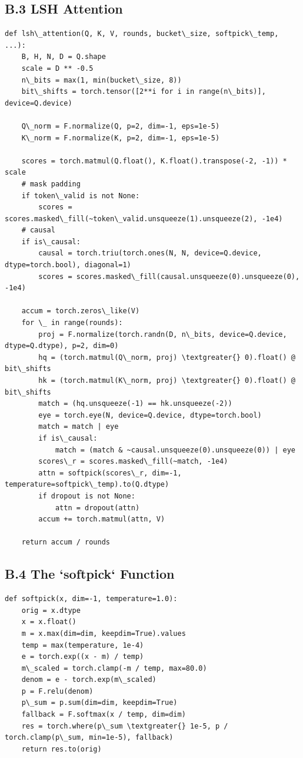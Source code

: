 \subsection{B.3 LSH Attention}

\begin{lstlisting}
def lsh\_attention(Q, K, V, rounds, bucket\_size, softpick\_temp, ...):
    B, H, N, D = Q.shape
    scale = D ** -0.5
    n\_bits = max(1, min(bucket\_size, 8))
    bit\_shifts = torch.tensor([2**i for i in range(n\_bits)], device=Q.device)
    
    Q\_norm = F.normalize(Q, p=2, dim=-1, eps=1e-5)
    K\_norm = F.normalize(K, p=2, dim=-1, eps=1e-5)
    
    scores = torch.matmul(Q.float(), K.float().transpose(-2, -1)) * scale
    # mask padding
    if token\_valid is not None:
        scores = scores.masked\_fill(~token\_valid.unsqueeze(1).unsqueeze(2), -1e4)
    # causal
    if is\_causal:
        causal = torch.triu(torch.ones(N, N, device=Q.device, dtype=torch.bool), diagonal=1)
        scores = scores.masked\_fill(causal.unsqueeze(0).unsqueeze(0), -1e4)
    
    accum = torch.zeros\_like(V)
    for \_ in range(rounds):
        proj = F.normalize(torch.randn(D, n\_bits, device=Q.device, dtype=Q.dtype), p=2, dim=0)
        hq = (torch.matmul(Q\_norm, proj) \textgreater{} 0).float() @ bit\_shifts
        hk = (torch.matmul(K\_norm, proj) \textgreater{} 0).float() @ bit\_shifts
        match = (hq.unsqueeze(-1) == hk.unsqueeze(-2))
        eye = torch.eye(N, device=Q.device, dtype=torch.bool)
        match = match | eye
        if is\_causal:
            match = (match & ~causal.unsqueeze(0).unsqueeze(0)) | eye
        scores\_r = scores.masked\_fill(~match, -1e4)
        attn = softpick(scores\_r, dim=-1, temperature=softpick\_temp).to(Q.dtype)
        if dropout is not None:
            attn = dropout(attn)
        accum += torch.matmul(attn, V)
    
    return accum / rounds
\end{lstlisting}

\subsection{B.4 The `softpick` Function}

\begin{lstlisting}
def softpick(x, dim=-1, temperature=1.0):
    orig = x.dtype
    x = x.float()
    m = x.max(dim=dim, keepdim=True).values
    temp = max(temperature, 1e-4)
    e = torch.exp((x - m) / temp)
    m\_scaled = torch.clamp(-m / temp, max=80.0)
    denom = e - torch.exp(m\_scaled)
    p = F.relu(denom)
    p\_sum = p.sum(dim=dim, keepdim=True)
    fallback = F.softmax(x / temp, dim=dim)
    res = torch.where(p\_sum \textgreater{} 1e-5, p / torch.clamp(p\_sum, min=1e-5), fallback)
    return res.to(orig)
\end{lstlisting}


